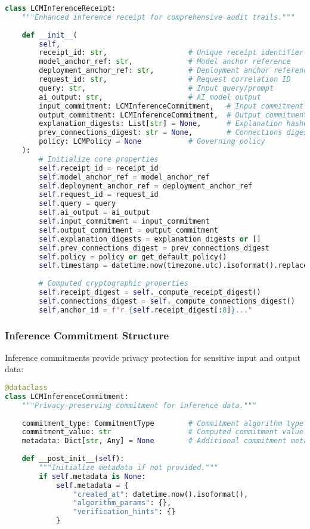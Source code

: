 \documentclass[12pt,a4paper]{article}
\begin{document}
\begin{lstlisting}[language=Python, caption=LCM Inference Receipt Structure]
class LCMInferenceReceipt:
    """Enhanced inference receipt for comprehensive audit trails."""
    
    def __init__(
        self,
        receipt_id: str,                   # Unique receipt identifier
        model_anchor_ref: str,             # Model anchor reference
        deployment_anchor_ref: str,        # Deployment anchor reference
        request_id: str,                   # Request correlation ID
        query: str,                        # Input query/prompt
        ai_output: str,                    # AI model output
        input_commitment: LCMInferenceCommitment,   # Input commitment
        output_commitment: LCMInferenceCommitment,  # Output commitment
        explanation_digests: List[str] = None,      # Explanation hashes
        prev_connections_digest: str = None,        # Connections digest
        policy: LCMPolicy = None           # Governing policy
    ):
        # Initialize core properties
        self.receipt_id = receipt_id
        self.model_anchor_ref = model_anchor_ref
        self.deployment_anchor_ref = deployment_anchor_ref
        self.request_id = request_id
        self.query = query
        self.ai_output = ai_output
        self.input_commitment = input_commitment
        self.output_commitment = output_commitment
        self.explanation_digests = explanation_digests or []
        self.prev_connections_digest = prev_connections_digest
        self.policy = policy or get_default_policy()
        self.timestamp = datetime.now(timezone.utc).isoformat().replace('+00:00', 'Z')
        
        # Computed cryptographic properties
        self.receipt_digest = self._compute_receipt_digest()
        self.connections_digest = self._compute_connections_digest()
        self.anchor_id = f"r_{self.receipt_digest[:8]}..."
\end{lstlisting}

\subsubsection{Inference Commitment Structure}

Inference commitments provide privacy protection for sensitive input and output data:

\begin{lstlisting}[language=Python, caption=Inference Commitment Structure]
@dataclass
class LCMInferenceCommitment:
    """Privacy-preserving commitment for inference data."""
    
    commitment_type: CommitmentType        # Commitment algorithm type
    commitment_value: str                  # Computed commitment value
    metadata: Dict[str, Any] = None        # Additional commitment metadata
    
    def __post_init__(self):
        """Initialize metadata if not provided."""
        if self.metadata is None:
            self.metadata = {
                "created_at": datetime.now().isoformat(),
                "algorithm_params": {},
                "verification_hints": {}
            }
\end{lstlisting}
\end{document}
